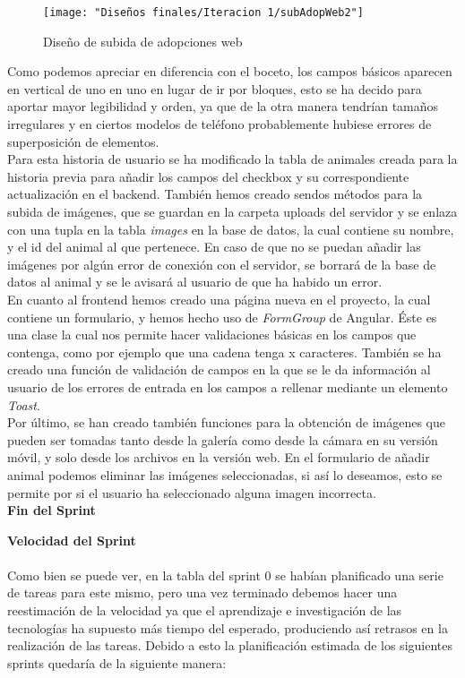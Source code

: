\begin{figure}[H]
	\centering
	\texttt{[image: "Diseños finales/Iteracion 1/subAdopWeb2"]}
	\caption{Diseño de subida de adopciones web}
	\label{fig:subadopweb}
\end{figure}

Como podemos apreciar en diferencia con el boceto, los campos básicos aparecen en vertical de uno en uno en lugar de ir por bloques, esto se ha decido para aportar mayor legibilidad y orden, ya que de la otra manera tendrían tamaños irregulares y en ciertos modelos de teléfono probablemente hubiese errores de superposición de elementos. \\

Para esta historia de usuario se ha modificado la tabla de animales creada para la historia previa para añadir los campos del checkbox y su correspondiente actualización en el backend. También hemos creado sendos métodos para la subida de imágenes, que se guardan en la carpeta uploads del servidor y se enlaza con una tupla en la tabla \textit{images} en la base de datos, la cual contiene su nombre, y el id del animal al que pertenece. En caso de que no se puedan añadir las imágenes por algún error de conexión con el servidor, se borrará de la base de datos al animal y se le avisará al usuario de que ha habido un error. \\


En cuanto al frontend hemos creado una página nueva en el proyecto, la cual contiene un formulario, y hemos hecho uso de \textit{FormGroup} de Angular. Éste es una clase la cual nos permite hacer validaciones básicas en los campos que contenga, como por ejemplo que una cadena tenga x caracteres. También se ha creado una función de validación de campos en la que se le da información al usuario de los errores de entrada en los campos a rellenar mediante un elemento \textit{Toast}. \\

Por último, se han creado también funciones para la obtención de imágenes que pueden ser tomadas tanto desde la galería como desde la cámara en su versión móvil, y solo desde los archivos en la versión web. En el formulario de añadir animal podemos eliminar las imágenes seleccionadas, si así lo deseamos, esto se permite por si el usuario ha seleccionado alguna imagen incorrecta.\\

\Large{\textbf{Fin del Sprint}}

\textbf{Velocidad del Sprint} \\ \\
Como bien se puede ver, en la tabla del sprint 0 se habían planificado una serie de tareas para este mismo, pero una vez terminado debemos hacer una reestimación de la velocidad ya que el aprendizaje e investigación de las tecnologías ha supuesto más tiempo del esperado, produciendo así retrasos en la realización de las tareas. Debido a esto la planificación estimada de los siguientes sprints quedaría de la siguiente manera: \\

